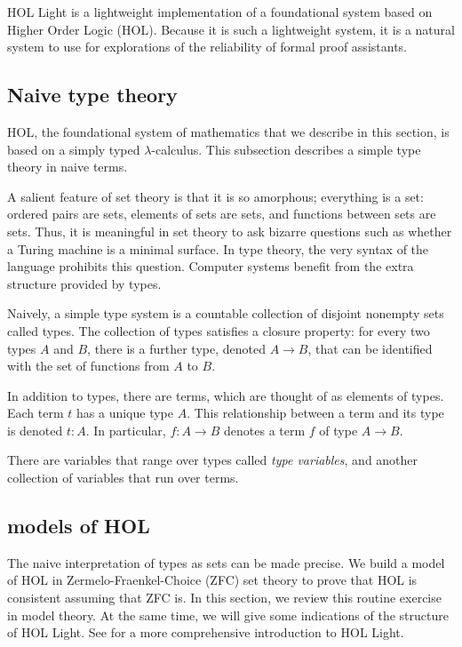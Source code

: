 \documentclass[brochure,english,12pt]{bourbaki}
\theoremstyle{plain}
\begin{document}
HOL Light is a lightweight implementation of a foundational system
based on Higher Order Logic (HOL).  Because it is such a lightweight
system, it is a natural system to use for explorations of the
reliability of formal proof assistants.

\subsection{Naive type theory}

HOL, the foundational system of mathematics that we describe in this
section, is based on a simply typed $\lambda$-calculus.  This
subsection describes a simple type theory in naive terms.

A salient feature of set theory is that it is so amorphous; everything
is a set: ordered pairs are sets, elements of sets are sets, and
functions between sets are sets.  Thus, it is meaningful in set theory
to ask bizarre questions such as whether a Turing machine is a minimal
surface.  In type theory, the very syntax of the language prohibits
this question.  Computer systems benefit from the extra structure
provided by types.

Naively, a simple type system is a countable collection of disjoint
nonempty sets called types.  The collection of types satisfies a
closure property: for every two types $A$ and $B$, there is a further
type, denoted $A\to B$, that can be identified with the set of
functions from $A$ to $B$.

In addition to types, there are terms, which are thought of as
elements of types.  Each term $t$ has a unique type $A$.  This
relationship between a term and its type is denoted $t:A$.  In
particular, $f:A\to B$ denotes a term $f$ of type $A\to B$.

There are variables that range over types called {\it type variables},
and another collection of variables that run over terms.


\subsection{models of HOL}

The naive interpretation of types as sets can be made precise.  We
build a model of HOL in Zermelo-Fraenkel-Choice (ZFC) set theory to
prove that HOL is consistent assuming that ZFC is.  In this section,
we review this routine exercise in model theory.  At the same time, we
will give some indications of the structure of HOL Light.  See
\cite{harrison2009hol} for a more comprehensive introduction to HOL
Light.
\end{document}
